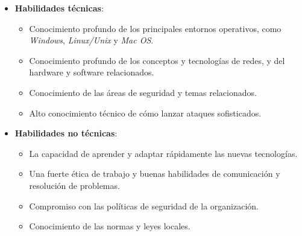 \begin{itemize}
    \item \textbf{Habilidades técnicas}:
          \begin{itemize}
              \item Conocimiento profundo de los principales entornos operativos, como \textit{Windows}, \textit{Linux/Unix} y \textit{Mac OS}.
              \item Conocimiento profundo de los conceptos y tecnologías de redes, y del hardware y software relacionados.
              \item Conocimiento de las áreas de seguridad y temas relacionados.
              \item Alto conocimiento técnico de cómo lanzar ataques sofisticados.
          \end{itemize}
    \item \textbf{Habilidades no técnicas}:
          \begin{itemize}
              \item La capacidad de aprender y adaptar rápidamente las nuevas tecnologías.
              \item Una fuerte ética de trabajo y buenas habilidades de comunicación y resolución de problemas.
              \item Compromiso con las políticas de seguridad de la organización.
              \item Conocimiento de las normas y leyes locales.
          \end{itemize}
\end{itemize}